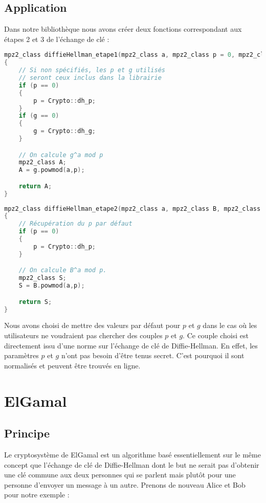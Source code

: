 \subsection{Application}
Dans notre bibliothèque nous avons créer deux fonctions correspondant aux étapes 2 et 3 de l'échange de clé :
\begin{lstlisting}[language=C++]
mpz2_class diffieHellman_etape1(mpz2_class a, mpz2_class p = 0, mpz2_class g = 0)
{
	// Si non spécifiés, les p et g utilisés
	// seront ceux inclus dans la librairie
	if (p == 0)
	{
		p = Crypto::dh_p;
	}
	if (g == 0)
	{
		g = Crypto::dh_g;
	}

	// On calcule g^a mod p
	mpz2_class A;
	A = g.powmod(a,p);

	return A;
}
\end{lstlisting}
\begin{lstlisting}[language=C++]
mpz2_class diffieHellman_etape2(mpz2_class a, mpz2_class B, mpz2_class p)
{
	// Récupération du p par défaut
	if (p == 0)
	{
		p = Crypto::dh_p;
	}

	// On calcule B^a mod p.
	mpz2_class S;
	S = B.powmod(a,p);

	return S;
}
\end{lstlisting}

Nous avons choisi de mettre des valeurs par défaut pour $p$ et $g$ dans le cas où les utilisateurs ne voudraient pas chercher des couples $p$ et $g$. Ce couple choisi est directement issu d'une norme sur l'échange de clé de Diffie-Hellman. En effet, les paramètres $p$ et $g$ n'ont pas besoin d'être tenus secret. C'est pourquoi il sont normalisés et peuvent être trouvés en ligne. 



\section{ElGamal}
\subsection{Principe}

Le cryptosystème de ElGamal est un algorithme basé essentiellement sur le même concept que l'échange de clé de Diffie-Hellman dont le but ne serait pas d'obtenir une clé commune aux deux personnes qui se parlent mais plutôt pour une personne d'envoyer un message à un autre. Prenons de nouveau Alice et Bob pour notre exemple :

